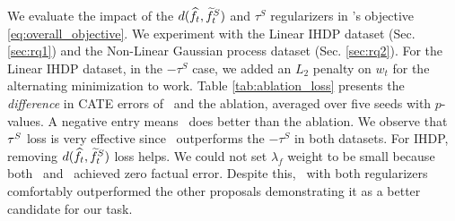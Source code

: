 We evaluate the impact of the $d(\widehat{f}_t,\widetilde{f}^S_t)$ and $\tau^S$ regularizers in \our's objective \ref{eq:overall_objective}. We experiment with the Linear IHDP dataset (Sec. \ref{sec:rq1}) and the Non-Linear Gaussian process dataset (Sec. \ref{sec:rq2}). For the Linear IHDP dataset, in the $-\tau^S$ case, we added an $L_2$ penalty on $w_t$ for the alternating minimization to work. Table \ref{tab:ablation_loss} presents the {\em difference} in CATE errors of \our\ and the ablation, averaged over five seeds with $p$-values. A negative entry means \our\ does better than the ablation. We observe that $\tau^S$ loss is very effective since \our\ outperforms the $-\tau^S$ in both datasets. 
For IHDP, removing $d(\widehat{f}_t,\widetilde{f}^S_t)$ loss helps. We could not set $\lambda_f$ weight to be small because both \realonly\ and \muonly\ achieved zero factual error. 
Despite this, \our\ with both regularizers  comfortably outperformed the other proposals demonstrating it as a better candidate for our task.


